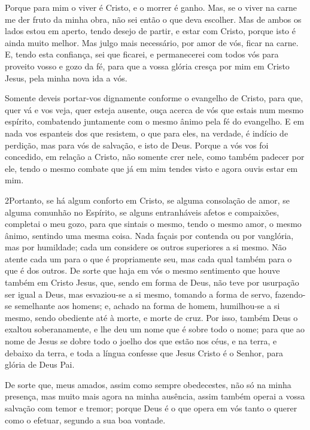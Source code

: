 Porque para mim o viver é Cristo, e o morrer é ganho. Mas,
se o viver na carne me der fruto da minha obra, não sei então o que
deva escolher. Mas de ambos os lados estou em aperto, tendo
desejo de partir, e estar com Cristo, porque isto é ainda muito
melhor. Mas julgo mais necessário, por amor de vós, ficar na
carne. E, tendo esta confiança, sei que ficarei, e
permanecerei com todos vós para proveito vosso e gozo da fé,
para que a vossa glória cresça por mim em Cristo Jesus, pela
minha nova ida a vós.

Somente deveis portar-vos dignamente conforme o evangelho de
Cristo, para que, quer vá e vos veja, quer esteja ausente, ouça
acerca de vós que estais num mesmo espírito, combatendo juntamente
com o mesmo ânimo pela fé do evangelho. E em nada vos
espanteis dos que resistem, o que para eles, na verdade, é indício
de perdição, mas para vós de salvação, e isto de Deus. Porque
a vós vos foi concedido, em relação a Cristo, não somente crer nele,
como também padecer por ele, tendo o mesmo combate que já em
mim tendes visto e agora ouvis estar em mim.

\medskip

\lettrine{2} Portanto, se há algum conforto em Cristo, se
alguma consolação de amor, se alguma comunhão no Espírito, se alguns
entranháveis afetos e compaixões, completai o meu gozo, para que
sintais o mesmo, tendo o mesmo amor, o mesmo ânimo, sentindo uma
mesma coisa. Nada façais por contenda ou por vanglória, mas por
humildade; cada um considere os outros superiores a si mesmo.
Não atente cada um para o que é propriamente seu, mas cada qual
também para o que é dos outros. De sorte que haja em vós o mesmo
sentimento que houve também em Cristo Jesus, que, sendo em forma
de Deus, não teve por usurpação ser igual a Deus, mas
esvaziou-se a si mesmo, tomando a forma de servo, fazendo-se
semelhante aos homens; e, achado na forma de homem, humilhou-se
a si mesmo, sendo obediente até à morte, e morte de cruz. Por
isso, também Deus o exaltou soberanamente, e lhe deu um nome que é
sobre todo o nome; para que ao nome de Jesus se dobre todo o
joelho dos que estão nos céus, e na terra, e debaixo da terra,
e toda a língua confesse que Jesus Cristo é o Senhor, para
glória de Deus Pai.

De sorte que, meus amados, assim como sempre obedecestes, não só
na minha presença, mas muito mais agora na minha ausência, assim
também operai a vossa salvação com temor e tremor; porque
Deus é o que opera em vós tanto o querer como o efetuar, segundo a
sua boa vontade.

